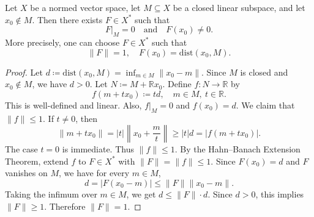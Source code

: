 \begin{corollary} \label{cl: separation from closed subspace}
    Let \(X\) be a normed vector space, let \(M \subseteq X\) be a closed linear subspace, and let \(x_0 \notin M\). Then there exists \(F \in X^*\) such that
    \[
        F\vert_M = 0 \quad \text{and} \quad F(x_0) \neq 0.
    \]
    More precisely, one can choose \(F \in X^*\) such that
    \[
        \lVert F \rVert = 1, \quad F(x_0) = \mathrm{dist}(x_0, M).
    \]
\end{corollary}

\begin{proof}
    Let \(d \coloneqq \mathrm{dist}(x_0, M) = \inf_{m \in M} \lVert x_0 - m \rVert\). Since \(M\) is closed and \(x_0 \notin M\), we have \(d > 0\). Let \(N \coloneqq M + \mathbb{R} x_0\). Define \(f : N \to \mathbb{R}\) by
    \[
        f(m + tx_0) \coloneqq td, \quad m \in M,\ t \in \mathbb{R}.
    \]
    This is well-defined and linear. Also, \(f\vert_M = 0\) and \(f(x_0) = d\). We claim that \(\lVert f \rVert \leq 1\). If \(t \neq 0\), then
    \[
        \lVert m + tx_0 \rVert = \vert t \vert \left\lVert x_0 + \frac{m}{t} \right\rVert \geq \vert t \vert d = \vert f(m + tx_0) \vert.
    \]
    The case \(t = 0\) is immediate. Thus \(\lVert f \rVert \leq 1\). By the Hahn--Banach Extension Theorem, extend \(f\) to \(F \in X^*\) with \(\lVert F \rVert = \lVert f \rVert \leq 1\). Since \(F(x_0) = d\) and \(F\) vanishes on \(M\), we have for every \(m \in M\),
    \[
        d = \vert F(x_0 - m) \vert \leq \lVert F \rVert \lVert x_0 - m \rVert.
    \]
    Taking the infimum over \(m \in M\), we get \(d \leq \lVert F \rVert \cdot d\). Since \(d > 0\), this implies \(\lVert F \rVert \geq 1\). Therefore \(\lVert F \rVert = 1\).
\end{proof}

